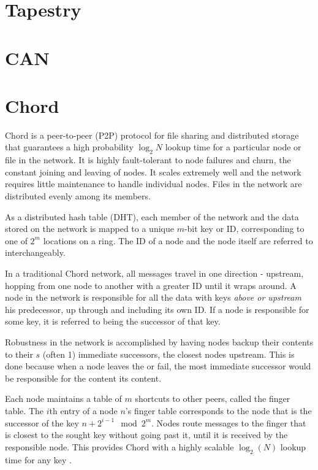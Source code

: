\documentclass[10pt,letterpaper]{report}
\begin{document}
\section{Tapestry}
\cite{tapestry}

\section{CAN}
\cite{can}

\section{Chord}
Chord \cite{chord} is a peer-to-peer (P2P) protocol for file sharing and distributed storage that guarantees a high probability $\log_{2} N$ lookup time for a particular node or file in the network. 
It is highly fault-tolerant to node failures and churn, the constant joining and leaving of nodes.  It scales extremely well and the network requires little maintenance to handle individual nodes.  
Files in the network are distributed evenly among its members.

As a distributed hash table (DHT), each member of the network and the data stored on the network is mapped to a unique $m$-bit key or ID, corresponding to one of  $2^m$ locations on a ring. 
The ID of a node and the node itself are referred to interchangeably.

In a traditional Chord network, all messages travel in one direction - upstream, hopping from one node to another with a greater ID until it wraps around.
A node in the network is responsible for all the data with keys \textit{above or upstream} his predecessor, up through and including its own ID.  If a node is responsible for some key, it is referred to being the successor of that key.

Robustness in the network is accomplished by having nodes backup their contents to their $s$ (often 1) immediate successors, the closest nodes upstream.  
This is done because when a node leaves the or fail, the most immediate successor would be responsible for the content its content.

Each node maintains a table of $m$ shortcuts to other peers, called the finger table.   The $i$th entry of a node $n$'s finger table corresponds to the node that is the successor of the key $n+2^{i-1} \mod 2^m $.  Nodes route messages to the finger that is closest to the sought key without going past it, until it is received by the responsible node.  This provides Chord with a highly scalable $\log_2(N)$ lookup time for any key \cite{chord}.
\end{document}
